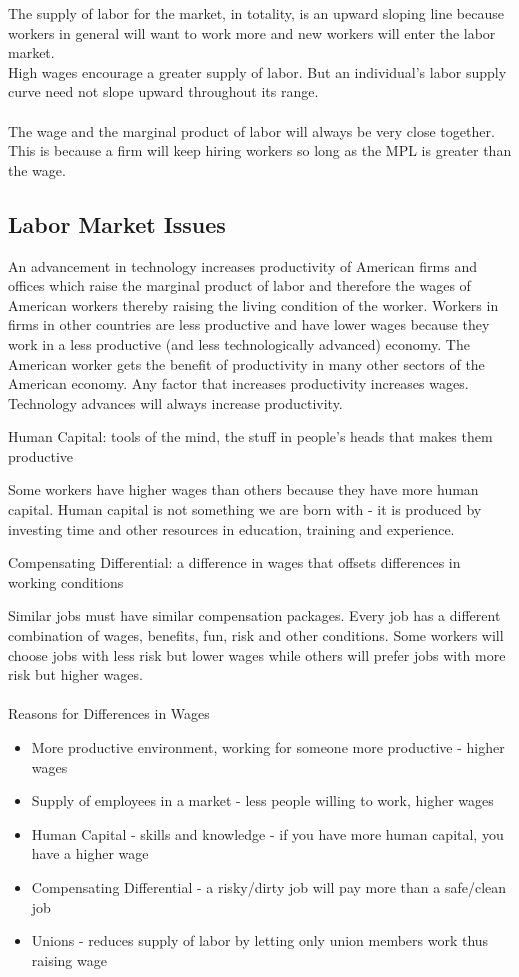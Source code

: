 \documentclass[12pt]{article}
\begin{document}
The supply of labor for the market, in totality, is an upward sloping line because workers in general will want to work more and new workers will enter the labor market. \\

High wages encourage a greater supply of labor. But an individual's labor supply curve need not slope upward throughout its range. \\~\\ The wage and the marginal product of labor will always be very close together. This is because a firm will keep hiring workers so long as the MPL is greater than the wage. 

\subsection{Labor Market Issues}
An advancement in technology increases productivity of American firms and offices which raise the marginal product of labor and therefore the wages of American workers thereby raising the living condition of the worker. Workers in firms in other countries are less productive and have lower wages because they work in a less productive (and less technologically advanced) economy. The American worker gets the benefit of productivity in many other sectors of the American economy. Any factor that increases productivity increases wages. \\
Technology advances will always increase productivity. 
\begin{definition} Human Capital: tools of the mind, the stuff in people's heads that makes them productive \end{definition}
Some workers have higher wages than others because they have more human capital. Human capital is not something we are born with - it is produced by investing time and other resources in education, training and experience.
\begin{definition} Compensating Differential: a difference in wages that offsets differences in working conditions \end{definition}
Similar jobs must have similar compensation packages. Every job has a different combination of wages, benefits, fun, risk and other conditions. Some workers will choose jobs with less risk but lower wages while others will prefer jobs with more risk but higher wages.  \\~\\ 
Reasons for Differences in Wages \begin{itemize} 
\item More productive environment, working for someone more productive - higher wages 
\item Supply of employees in a market - less people willing to work, higher wages 
\item Human Capital - skills and knowledge - if you have more human capital, you have a higher wage 
\item Compensating Differential - a risky/dirty job will pay more than a safe/clean job 
\item Unions - reduces supply of labor by letting only union members work thus raising wage \end{itemize} 
\end{document}
